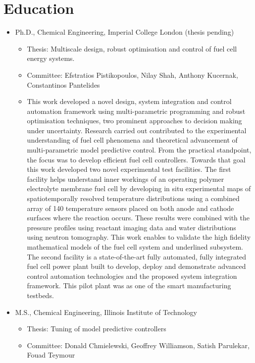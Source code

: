 \documentclass[10pt]{article}
\begin{document}
\section{Education}
\begin{itemize}
\item Ph.D., Chemical Engineering, Imperial College London (thesis pending)
\begin{itemize}[nosep]
\item Thesis: Multiscale design, robust optimisation and control of fuel cell energy systems.
\item Committee: Efstratios Pistikopoulos, Nilay Shah, Anthony Kucernak, Constantinos Pantelides%
\item This work developed a novel design, system integration and control automation framework using multi-parametric programming and robust optimisation techniques, two prominent approaches to decision making under uncertainty.  Research carried out contributed to the experimental understanding of fuel cell phenomena and theoretical advancement of multi-parametric model predictive control. From the practical standpoint, the focus was to develop efficient fuel cell controllers. Towards that goal this work developed two novel experimental test facilities. The first facility helps understand inner workings of an operating polymer electrolyte membrane fuel cell by developing in situ experimental maps of spatiotemporally resolved temperature distributions using a combined array of 140 temperature sensors placed on both anode and cathode surfaces where the reaction occurs. These results were combined with the pressure profiles using reactant imaging data and water distributions using neutron tomography. This work enables to validate the high fidelity mathematical models of the fuel cell system and underlined subsystem. The second facility is a state-of-the-art fully automated, fully integrated fuel cell power plant built to develop, deploy and demonstrate advanced control automation technologies and the proposed system integration framework. This pilot plant was as one of the smart manufacturing testbeds.
\end{itemize}
\item M.S., Chemical Engineering, Illinois Institute of Technology
\begin{itemize}[nosep]
  \item Thesis: Tuning of model predictive controllers
  \item Committee: Donald Chmielewski, Geoffrey Williamson, Satish Parulekar, Fouad Teymour

\end{itemize}
\end{itemize}
\end{document}

